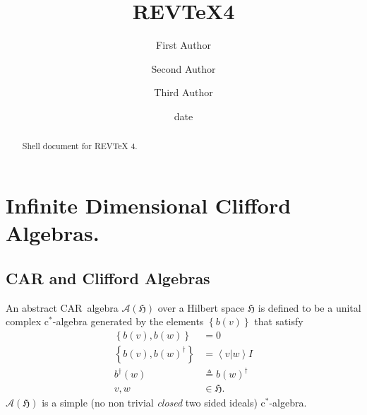 \documentclass[aps,preprint]{revtex4}%
\begin{document}
\title[Short title for running header]{REV\TeX4}
\author{First Author}
\author{Second Author}
\author{Third Author}

\begin{abstract}
Shell document for REV\TeX{} 4.

\end{abstract}
\date[Date text]{date}




\maketitle
\tableofcontents


\section{Infinite Dimensional Clifford Algebras.}

\subsection{CAR and Clifford Algebras}

An abstract CAR\ algebra $\mathcal{A}\left(  \mathfrak{H}\right)  $ over a
Hilbert space $\mathfrak{H}$ is defined to be a unital complex c$^{\ast}%
$-algebra generated by the elements $\left\{  b\left(  v\right)  \right\}  $
that satisfy%
\begin{align}
\left\{  b\left(  v\right)  ,b\left(  w\right)  \right\}   &  =0\\
\left\{  b\left(  v\right)  ,b\left(  w\right)  ^{\dagger}\right\}   &
=\left\langle \left.  v\right\vert w\right\rangle I\\
b^{\dagger}\left(  w\right)   &  \triangleq b\left(  w\right)  ^{\dagger}\\
v,w &  \in\mathfrak{H.}%
\end{align}
$\mathcal{A}\left(  \mathfrak{H}\right)  $ is a simple (no non trivial
\emph{closed} two sided ideals) c$^{\ast}$-algebra.
\end{document}
